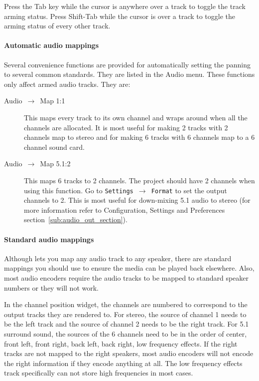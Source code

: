 Press the Tab key while the cursor is anywhere over a track to
toggle the track arming status. Press Shift-Tab while the cursor is
over a track to toggle the arming status of every other track.

\paragraph{Automatic audio mappings} Several convenience functions
are provided for automatically setting the panning to several common
standards. They are listed in the Audio menu. These functions only
affect armed audio tracks. They are:

\begin{description}
\item[Audio~$\rightarrow$~Map 1:1] This maps every track to
  its own channel and wraps around when all the channels are
  allocated. It is most useful for making 2 tracks with 2 channels map
  to stereo and for making 6 tracks with 6 channels map to a 6 channel
  sound card.
\item[Audio~$\rightarrow$~Map 5.1:2] This maps 6 tracks to 2
  channels. The project should have 2 channels when using this
  function. Go to \texttt{Settings $\rightarrow$ Format} to set the
  output channels to 2. This is most useful for down-mixing 5.1 audio
  to stereo (for more information refer to Configuration, Settings and
  Preferences section~\ref{sub:audio_out_section}).
\end{description}

\paragraph{Standard audio mappings} Although \CGG{} lets you map any
audio track to any speaker, there are standard mappings you should
use to ensure the media can be played back elsewhere. Also, most
audio encoders require the audio tracks to be mapped to standard
speaker numbers or they will not work.

In the channel position widget, the channels are numbered to
correspond to the output tracks they are rendered to. For stereo,
the source of channel 1 needs to be the left track and the source of
channel 2 needs to be the right track.  For 5.1 surround sound, the
sources of the 6 channels need to be in the order of center, front
left, front right, back left, back right, low frequency effects. If
the right tracks are not mapped to the right speakers, most audio
encoders will not encode the right information if they encode
anything at all. The low frequency effects track specifically can
not store high frequencies in most cases.


